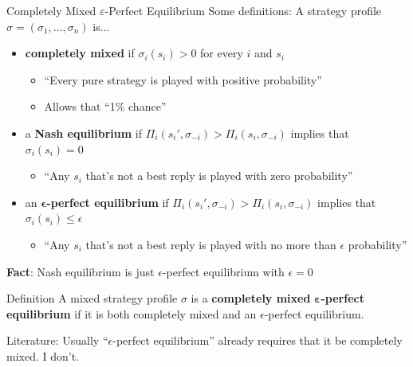 \begin{frame}{Completely Mixed $\varepsilon$-Perfect Equilibrium}
Some definitions: A strategy profile $\sigma=(\sigma_1,\ldots,\sigma_n)$ is...
\begin{itemize}
    \item \textbf{completely mixed} if $\sigma_i(s_i)>0$ for every $i$ and $s_i$
    \begin{itemize}
        \item ``Every pure strategy is played with positive probability''
        \item Allows that ``1\% chance''
    \end{itemize}
    \item a \textbf{Nash equilibrium} if $\Pi_i(s_i',\sigma_{-i})>\Pi_i(s_i,\sigma_{-i})$ implies that $\sigma_i(s_i)=0$
    \begin{itemize}
        \item ``Any $s_i$ that's not a best reply is played with zero probability''
    \end{itemize}
    \item an $\bm{\epsilon}$\textbf{-perfect equilibrium} if $\Pi_i(s_i',\sigma_{-i})>\Pi_i(s_i,\sigma_{-i})$ implies that $\sigma_i(s_i)\leq\epsilon$
    \begin{itemize}
        \item ``Any $s_i$ that's not a best reply is played with no more than $\epsilon$ probability''
    \end{itemize}
\end{itemize}
\bsk
\textbf{Fact}: Nash equilibrium is just $\epsilon$-perfect equilibrium with $\epsilon=0$
\bsk
\begin{block}{Definition}
A mixed strategy profile $\sigma$ is a \textbf{completely mixed} $\bm{\varepsilon}$\textbf{-perfect equilibrium} if it is both completely mixed and an $\epsilon$-perfect equilibrium.
\end{block}
{\footnotesize Literature: Usually ``$\epsilon$-perfect equilibrium'' already requires that it be completely mixed. I don't.}
\end{frame}

